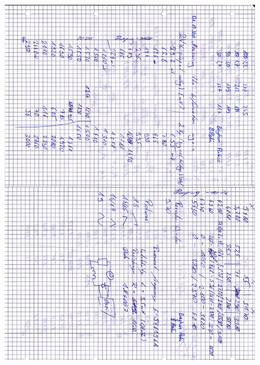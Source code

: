\begin{appendix}
\begin{figure}[H]
\centering \includegraphics[width=\textwidth]{Bilder/anh3.png}
\end{figure}

 
\end{appendix}

